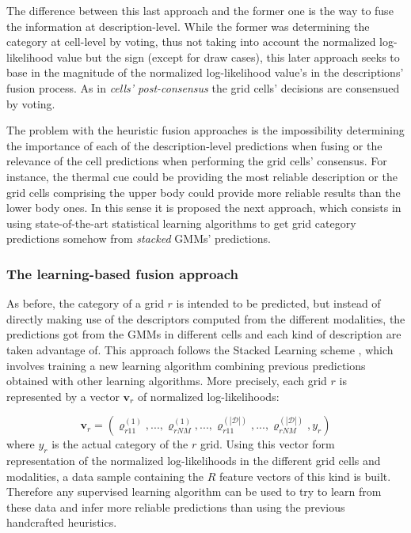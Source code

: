 \documentclass[10pt,twocolumn,letterpaper]{article}
\begin{document}
The difference between this last approach and the former one is the way to fuse the information at description-level. While the former was determining the category at cell-level by voting, thus not taking into account the normalized log-likelihood value but the sign (except for draw cases), this later approach seeks to base in the magnitude of the normalized log-likelihood value's in the descriptions' fusion process. As in \textit{cells' post-consensus} the grid cells' decisions are consensued by voting.

The problem with the heuristic fusion approaches is the impossibility determining the importance of each of the description-level predictions when fusing or the relevance of the cell predictions when performing the grid cells' consensus. For instance, the thermal cue could be providing the most reliable description or the grid cells comprising the upper body could provide more reliable results than the lower body ones. In this sense it is proposed the next approach, which consists in using state-of-the-art statistical learning algorithms to get grid category predictions somehow from \textit{stacked} GMMs' predictions.

\subsubsection{The learning-based fusion approach}

As before, the category of a grid $r$ is intended to be predicted, but instead of directly making use of the descriptors computed from the different modalities, the predictions got from the GMMs in different cells and each kind of description are taken advantage of. This approach follows the Stacked Learning scheme \cite{cohen2005stacked, gatta2011multi}, which involves training a new learning algorithm combining previous predictions obtained with other learning algorithms. More precisely, each grid $r$ is represented by a vector $\mathbf{v}_r$ of normalized log-likelihoods:

$$\mathbf{v}_r = (\varrho_{r11}^{(1)}, ..., \varrho_{rNM}^{(1)}, ..., \varrho_{r11}^{(|\mathcal{D}|)}, ..., \varrho_{rNM}^{(|\mathcal{D}|)}, y_r)$$
where $y_r$ is the actual category of the $r$ grid. Using this vector form representation of the normalized log-likelihoods in the different grid cells and modalities, a data sample containing the $R$ feature vectors of this kind is built. Therefore any supervised learning algorithm can be used to try to learn from these data and infer more reliable predictions than using the previous handcrafted heuristics. 
\end{document}

